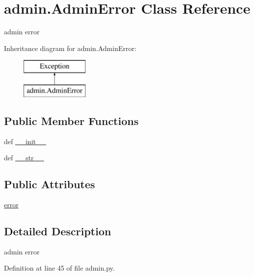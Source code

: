 \hypertarget{classadmin_1_1AdminError}{\section{admin.\-Admin\-Error Class Reference}
\label{classadmin_1_1AdminError}
}


admin error  


Inheritance diagram for admin.\-Admin\-Error\-:\begin{figure}[H]
\begin{center}
\leavevmode
\includegraphics[height=2.000000cm]{df/dee/classadmin_1_1AdminError}
\end{center}
\end{figure}
\subsection*{Public Member Functions}
\begin{DoxyCompactItemize}
\item 
def \hyperlink{classadmin_1_1AdminError_a2712ee3b794fa425e6e0eac6a1524749}{\-\_\-\-\_\-init\-\_\-\-\_\-}
\item 
def \hyperlink{classadmin_1_1AdminError_ab64b4ac0bacc03d3f5d4dc556a493445}{\-\_\-\-\_\-str\-\_\-\-\_\-}
\end{DoxyCompactItemize}
\subsection*{Public Attributes}
\begin{DoxyCompactItemize}
\item 
\hyperlink{classadmin_1_1AdminError_a2d3933c27c7f643bf649f9f208f35c72}{error}
\end{DoxyCompactItemize}


\subsection{Detailed Description}
admin error 

Definition at line 45 of file admin.\-py.



